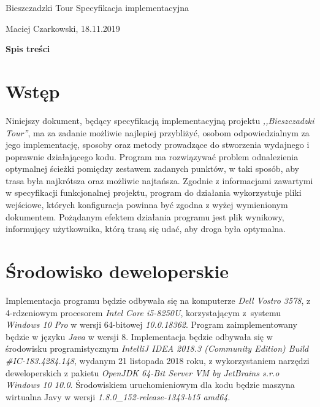 \documentclass[12pt,a4paper]{article}
\begin{document}
\begin{titlepage}
\vspace*{\fill}
\begin{center}
{\fontsize{50}{0.1}\selectfont Bieszczadzki Tour}
\huge Specyfikacja implementacyjna
\end{center}
\vspace*{\fill}
\begin{center}
Maciej Czarkowski, 18.11.2019
\end{center}
\end{titlepage}
\clearpage
\hspace{1cm}
\begin{center}
\LARGE\textbf{Spis treści}
\end{center}
\tableofcontents
\clearpage
\section{Wstęp}
Niniejszy dokument, będący specyfikacją implementacyjną projektu \textsl{,,Bieszczadzki Tour''}, ma za zadanie możliwie najlepiej przybliżyć, osobom odpowiedzialnym za jego implementację, sposoby oraz metody prowadzące do stworzenia wydajnego i poprawnie działającego kodu. Program ma rozwiązywać problem odnalezienia optymalnej ścieżki pomiędzy zestawem zadanych punktów, w taki sposób, aby trasa była najkrótsza oraz możliwie najtańsza. Zgodnie z informacjami zawartymi w specyfikacji funkcjonalnej projektu, program do działania wykorzystuje pliki wejściowe, których konfiguracja powinna być zgodna z wyżej wymienionym dokumentem. Pożądanym efektem działania programu jest plik wynikowy, informujący użytkownika, którą trasą się udać, aby droga była optymalna.\\
\section{Środowisko deweloperskie}
Implementacja programu będzie odbywała się na komputerze \textsl{Dell Vostro 3578}, z 4-rdzeniowym procesorem \textsl{Intel Core i5-8250U}, korzystającym z~systemu \textsl{Windows 10 Pro} w wersji 64-bitowej \textsl{10.0.18362}. Program zaimplementowany będzie w języku \textsl{Java} w wersji 8. Implementacja będzie odbywała się w środowisku programistycznym \textsl{IntelliJ IDEA 2018.3 (Community Edition)
Build \#IC-183.4284.148}, wydanym 21 listopada 2018 roku, z wykorzystaniem narzędzi deweloperskich z pakietu \textsl{OpenJDK 64-Bit Server VM by JetBrains s.r.o Windows 10 10.0}. Środowiskiem uruchomieniowym dla kodu będzie maszyna wirtualna Javy w wersji \textsl{1.8.0\_152-release-1343-b15 amd64}.
\end{document}
